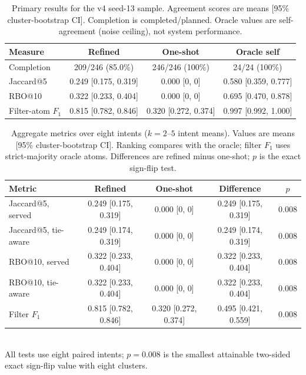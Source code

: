 \documentclass[sigconf,review]{acmart}
\begin{document}
\begin{table}[t]
\caption{Primary results for the v4 seed-13 sample. Agreement scores are means
[95\% cluster-bootstrap CI]. Completion is completed/planned. Oracle values
are self-agreement (noise ceiling), not system performance.}
\label{tab:results}
\centering\scriptsize\setlength{\tabcolsep}{3pt}
\begin{tabular}{@{}lccc@{}}
\toprule
Measure & Refined & One-shot & Oracle self\\
\midrule
Completion & 209/246 (85.0\%) & 246/246 (100\%) & 24/24 (100\%)\\
Jaccard@5 & 0.249 [0.175, 0.319] & 0.000 [0, 0] & 0.580 [0.359, 0.777]\\
RBO@10 & 0.322 [0.233, 0.404] & 0.000 [0, 0] & 0.695 [0.470, 0.878]\\
Filter-atom $F_1$ & 0.815 [0.782, 0.846] & 0.320 [0.272, 0.374] & 0.997 [0.992, 1.000]\\
\bottomrule
\end{tabular}
\end{table}

\iffalse %
\begin{table}[t]
\caption{Aggregate metrics over eight intents ($k=2$--$5$ intent means).
Values are means [95\% cluster-bootstrap CI]. Ranking compares with the
oracle; filter $F_1$ uses strict-majority oracle atoms. Differences are
refined minus one-shot; $p$ is the exact sign-flip test.}
\label{tab:results}
\centering\scriptsize\setlength{\tabcolsep}{5pt}
\begin{tabular}{@{}lcccc@{}}
\toprule
Metric & Refined & One-shot & Difference & $p$\\
\midrule
Jaccard@5, served & 0.249 [0.175, 0.319] & 0.000 [0, 0] & 0.249 [0.175, 0.319] & 0.008\\
Jaccard@5, tie-aware & 0.249 [0.174, 0.319] & 0.000 [0, 0] & 0.249 [0.174, 0.319] & 0.008\\
RBO@10, served & 0.322 [0.233, 0.404] & 0.000 [0, 0] & 0.322 [0.233, 0.404] & 0.008\\
RBO@10, tie-aware & 0.322 [0.233, 0.404] & 0.000 [0, 0] & 0.322 [0.233, 0.404] & 0.008\\
Filter $F_1$ & 0.815 [0.782, 0.846] & 0.320 [0.272, 0.374] & 0.495 [0.421, 0.559] & 0.008\\
\bottomrule
\end{tabular}
\\[2pt]
All tests use eight paired intents; $p=0.008$ is the smallest attainable
two-sided exact sign-flip value with eight clusters.
\end{table}
\end{document}
